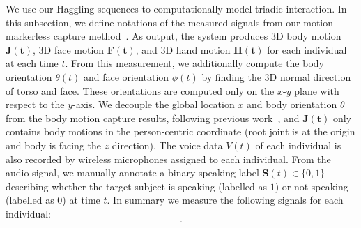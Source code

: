 
We use our Haggling sequences to computationally model triadic interaction.  In this subsection, we define notations of the measured signals from our motion markerless capture method~\cite{joo2017panoptic, joo2018}. As output, the system produces 3D body motion $\mathbf{J(t)}$, 3D face motion $\mathbf{F(t)}$, and 3D hand motion $\mathbf{H(t)}$ for each individual at each time $t$. From this measurement, we additionally compute the body orientation $\theta(t)$ and face orientation $\phi(t)$ by finding the 3D normal direction of torso and face. These orientations are computed only on the $x$-$y$ plane with respect to the $y$-axis. We decouple the global location $x$ and body orientation $\theta$ from the body motion capture results, following previous work~\cite{jain2016structural, holden2016deep}, and $\mathbf{J(t)}$ only contains body motions in the person-centric coordinate (root joint is at the origin and body is facing the $z$ direction). The voice data $V(t)$ of each individual is also recorded by wireless microphones assigned to each individual. From the audio signal, we manually annotate a binary speaking label $\mathbf{S}(t) \in \{0,1\}$ describing whether the target subject is speaking (labelled as $1$) or not speaking (labelled as $0$) at time $t$. In summary we measure the following signals for each individual:
\begin{equation}
[ \mathbf{x}, \boldsymbol{\theta}, \boldsymbol{\phi}, \mathbf{J}, \mathbf{F}, \mathbf{H}, \mathbf{V}, \mathbf{S} ].
\label{equation:measurement}
\end{equation}




